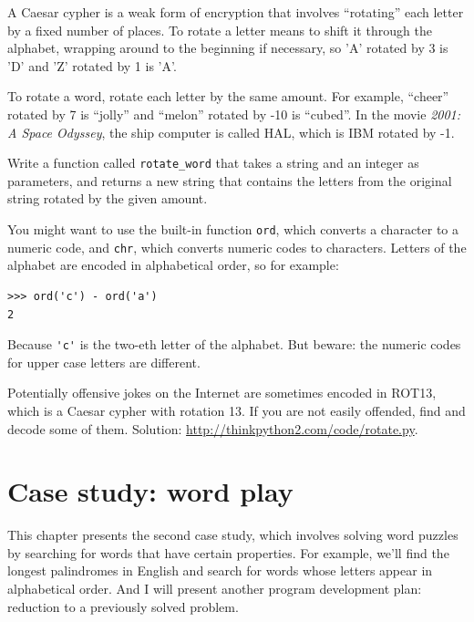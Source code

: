 \documentclass[10pt]{book}
\begin{document}
\begin{exercise}

\label{exrotate}
A Caesar cypher is a weak form of encryption that involves ``rotating'' each
letter by a fixed number of places.  To rotate a letter means
to shift it through the alphabet, wrapping around to the beginning if
necessary, so 'A' rotated by 3 is 'D' and 'Z' rotated by 1 is 'A'.

To rotate a word, rotate each letter by the same amount.
For example, ``cheer'' rotated by 7 is ``jolly'' and ``melon'' rotated
by -10 is ``cubed''.  In the movie {\em 2001: A Space Odyssey}, the 
ship computer is called HAL, which is IBM rotated by -1.


Write a function called \verb"rotate_word"
that takes a string and an integer as parameters, and returns
a new string that contains the letters from the original string
rotated by the given amount.  

You might want to use the built-in function {\tt ord}, which converts
a character to a numeric code, and {\tt chr}, which converts numeric
codes to characters.  Letters of the alphabet are encoded in alphabetical
order, so for example:

\begin{verbatim}
>>> ord('c') - ord('a')
2
\end{verbatim}

Because \verb"'c'" is the two-eth letter of the alphabet.  But
beware: the numeric codes for upper case letters are different.

Potentially offensive jokes on the Internet are sometimes encoded in
ROT13, which is a Caesar cypher with rotation 13.  If you are not
easily offended, find and decode some of them.  Solution:
\url{http://thinkpython2.com/code/rotate.py}.

\end{exercise}


\chapter{Case study: word play}
\label{wordplay}

This chapter presents the second case study, which involves
solving word puzzles by searching for words that have certain
properties.  For example, we'll find the longest palindromes
in English and search for words whose letters appear in
alphabetical order.  And I will present another program development
plan: reduction to a previously solved problem.
\end{document}
